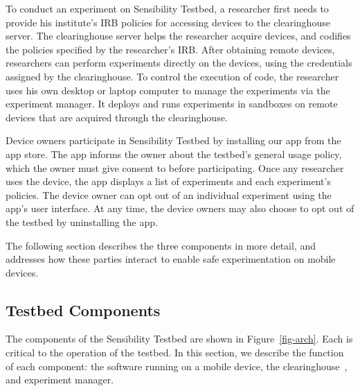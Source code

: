 To conduct an experiment on Sensibility Testbed, a researcher first 
needs to provide his institute's IRB policies for accessing devices to 
the clearinghouse server.  
The clearinghouse server helps the researcher acquire 
devices, and codifies the policies specified by the
researcher's IRB. 
After obtaining remote devices, researchers can perform
experiments directly on the devices, using the credentials assigned by
the clearinghouse. 
To control the execution of code, the researcher uses his own 
desktop or laptop computer to manage the 
experiments via the experiment manager. It deploys 
and runs experiments in sandboxes on remote devices that are 
acquired through the clearinghouse.

Device owners participate in Sensibility Testbed by installing our
app from the app store. The app informs the owner about the testbed's
general usage policy, which the owner must give consent to before
participating.  Once any researcher uses the device, the 
app displays a list of experiments and each experiment's policies. 
The device owner can opt out of an individual experiment using the
app's user interface. At any time, the device owners may also choose 
to opt out of the testbed by uninstalling the app.

\smallskip
The following section describes the three components in more detail, and 
addresses how these parties interact to enable safe experimentation on 
mobile devices. 



\subsection{Testbed Components}\label{sec-component}

The components of the Sensibility Testbed are shown in Figure~\ref{fig-arch}.
Each is critical to the operation of the testbed. 
In this section, we describe the function of each component: the
software running on a mobile device, the clearinghouse~\cite{ch}, 
and experiment manager.


